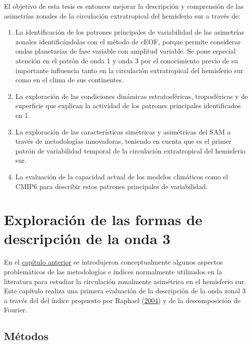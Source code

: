 \documentclass[12pt,oneside,a4paper]{reedthesis}
\begin{document}
El objetivo de esta tesis es entonces mejorar la descripción y comprensión de las asimetrías zonales de la circulación extratropical del hemisferio sur a través de:

\begin{enumerate}
\def\labelenumi{\arabic{enumi}.}
\item
  La identificación de los patrones principales de variabilidad de las asimetrías zonales identificándolas con el método de cEOF, porque permite considerar ondas planetarias de fase variable con amplitud variable.
  Se pone especial atención en el patrón de onda 1 y onda 3 por el conocimiento previo de su importante influencia tanto en la circulación extratropical del hemisferio sur como en el clima de sus continentes.
\item
  La exploración de las condiciones dinámicas estratosféricas, troposféricas y de superficie que explican la actividad de los patrones principales identificados en 1.
\item
  La exploración de las características simétricas y asimétricas del SAM a través de metodologías innovadoras, teniendo en cuenta que es el primer patrón de variabilidad temporal de la circulación extratropical del hemisferio sur.
\item
  La evaluación de la capacidad actual de los modelos climáticos como el CMIP6 para describir estos patrones principales de variabilidad.
\end{enumerate}

\hypertarget{onda3}{%
\chapter{Exploración de las formas de descripción de la onda 3}\label{onda3}}

En el \protect\hyperlink{intro}{capítulo anterior} se introdujeron conceptualmente algunos aspectos problemáticos de las metodologías e índices normalmente utilizados en la literatura para estudiar la circulación zonalmente asimétrica en el hemisferio sur.
Este capítulo realiza una primera evaluación de la descripción de la onda zonal 3 a través del del índice propuesto por Raphael (\protect\hyperlink{ref-raphael2004}{2004}) y de la descomposición de Fourier.

\hypertarget{muxe9todos}{%
\section{Métodos}\label{muxe9todos}}
\end{document}
